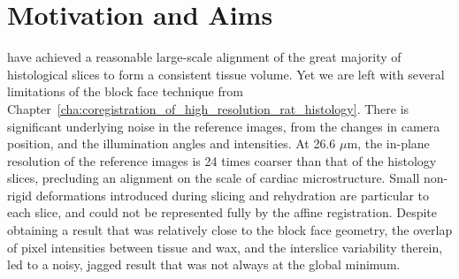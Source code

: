 \section{Motivation and Aims} %
\label{sec:motivation_and_aims}
   have achieved a reasonable large-scale alignment of the great majority of histological slices to form a consistent tissue volume. Yet we are left with several limitations of the block face technique from Chapter~\ref{cha:coregistration_of_high_resolution_rat_histology}. There is significant underlying noise in the reference images, from the changes in camera position, and the illumination angles and intensities. At 26.6 $\mu$m, the in-plane resolution of the reference images is 24 times coarser than that of the histology slices, precluding an alignment on the scale of cardiac microstructure. Small non-rigid deformations introduced during slicing and rehydration are particular to each slice, and could not be represented fully by the affine registration. Despite obtaining a result that was relatively close to the block face geometry, the overlap of pixel intensities between tissue and wax, and the interslice variability therein, led to a noisy, jagged result that was not always at the global minimum.
    
    
